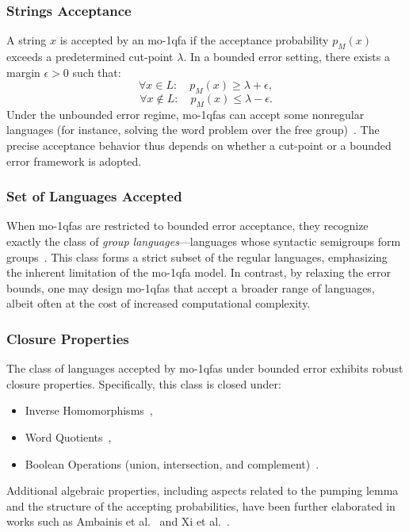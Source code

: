 \subsubsection{Strings Acceptance}
A string $x$ is accepted by an \gls{mo-1qfa} if the acceptance probability $p_M(x)$ exceeds a predetermined cut-point $\lambda$. In a bounded error setting, there exists a margin $\epsilon > 0$ such that:
\[
\forall x\in L:\quad p_M(x) \ge \lambda + \epsilon,
\]
\[
\forall x\notin L:\quad p_M(x) \le \lambda - \epsilon.
\]
Under the unbounded error regime, \glspl{mo-1qfa} can accept some nonregular languages (for instance, solving the word problem over the free group)~\cite{brodsky2002characterizations}. The precise acceptance behavior thus depends on whether a cut-point or a bounded error framework is adopted.

\subsubsection{Set of Languages Accepted}
When \glspl{mo-1qfa} are restricted to bounded error acceptance, they recognize exactly the class of \emph{group languages}—languages whose syntactic semigroups form groups~\cite{brodsky2002characterizations}. This class forms a strict subset of the regular languages, emphasizing the inherent limitation of the \gls{mo-1qfa} model. In contrast, by relaxing the error bounds, one may design \glspl{mo-1qfa} that accept a broader range of languages, albeit often at the cost of increased computational complexity.

\subsubsection{Closure Properties}
The class of languages accepted by \glspl{mo-1qfa} under bounded error exhibits robust closure properties. Specifically, this class is closed under:
\begin{itemize}
    \item Inverse Homomorphisms~\cite{brodsky2002characterizations},
    \item Word Quotients~\cite{brodsky2002characterizations},
    \item Boolean Operations (union, intersection, and complement)~\cite{freivalds2005languages,bertoni2003quantum}.
\end{itemize}
Additional algebraic properties, including aspects related to the pumping lemma and the structure of the accepting probabilities, have been further elaborated in works such as Ambainis et al.~\cite{ambainis1999probabilities} and Xi et al.~\cite{xi2008some}.

